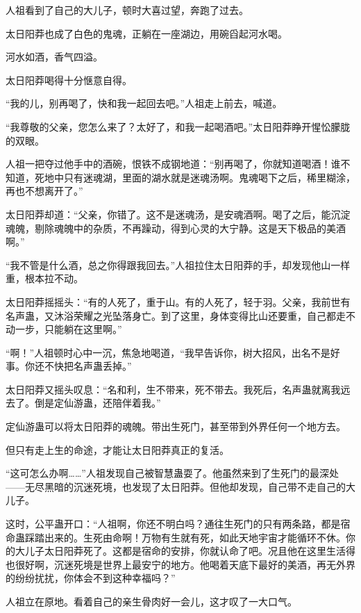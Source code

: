 
\begin{this_body}



人祖看到了自己的大儿子，顿时大喜过望，奔跑了过去。

太日阳莽也成了白色的鬼魂，正躺在一座湖边，用碗舀起河水喝。

河水如酒，香气四溢。

太日阳莽喝得十分惬意自得。

“我的儿，别再喝了，快和我一起回去吧。”人祖走上前去，喊道。

“我尊敬的父亲，您怎么来了？太好了，和我一起喝酒吧。”太日阳莽睁开惺忪朦胧的双眼。

人祖一把夺过他手中的酒碗，恨铁不成钢地道：“别再喝了，你就知道喝酒！谁不知道，死地中只有迷魂湖，里面的湖水就是迷魂汤啊。鬼魂喝下之后，稀里糊涂，再也不想离开了。”

太日阳莽却道：“父亲，你错了。这不是迷魂汤，是安魂酒啊。喝了之后，能沉淀魂魄，剔除魂魄中的杂质，不再躁动，得到心灵的大宁静。这是天下极品的美酒啊。”

“我不管是什么酒，总之你得跟我回去。”人祖拉住太日阳莽的手，却发现他山一样重，根本拉不动。

太日阳莽摇摇头：“有的人死了，重于山。有的人死了，轻于羽。父亲，我前世有名声蛊，又沐浴荣耀之光坠落身亡。到了这里，身体变得比山还要重，自己都走不动一步，只能躺在这里啊。”

“啊！”人祖顿时心中一沉，焦急地喝道，“我早告诉你，树大招风，出名不是好事。你还不快把名声蛊丢掉。”

太日阳莽又摇头叹息：“名和利，生不带来，死不带去。我死后，名声蛊就离我远去了。倒是定仙游蛊，还陪伴着我。”

定仙游蛊可以将太日阳莽的魂魄。带出生死门，甚至带到外界任何一个地方去。

但只有走上生的命途，才能让太日阳莽真正的复活。

“这可怎么办啊……”人祖发现自己被智慧蛊耍了。他虽然来到了生死门的最深处——无尽黑暗的沉迷死境，也发现了太日阳莽。但他却发现，自己带不走自己的大儿子。

这时，公平蛊开口：“人祖啊，你还不明白吗？通往生死门的只有两条路，都是宿命蛊踩踏出来的。生死由命啊！万物有生就有死，如此天地宇宙才能循环不休。你的大儿子太日阳莽死了。这都是宿命的安排，你就认命了吧。况且他在这里生活得也很好啊，沉迷死境是世界上最安宁的地方。他喝着天底下最好的美酒，再无外界的纷纷扰扰，你体会不到这种幸福吗？”

人祖立在原地。看着自己的亲生骨肉好一会儿，这才叹了一大口气。


\end{this_body}

